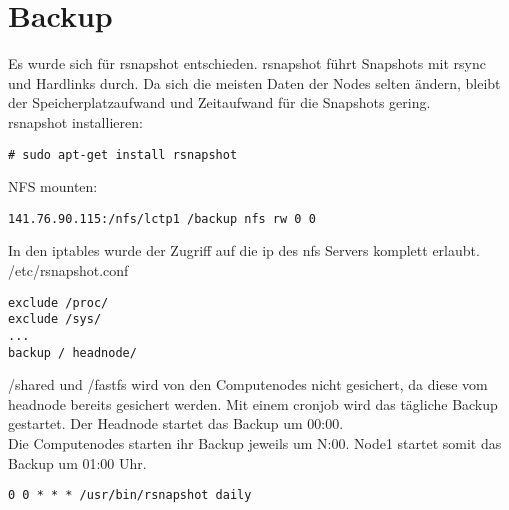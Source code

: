 \chapter{Backup}
Es wurde sich für rsnapshot entschieden. rsnapshot führt Snapshots mit rsync und Hardlinks durch.
Da sich die meisten Daten der Nodes selten ändern, bleibt der Speicherplatzaufwand und Zeitaufwand für die Snapshots gering.\\
rsnapshot installieren:
\begin{lstlisting}[style=Bash]
# sudo apt-get install rsnapshot
\end{lstlisting}
NFS mounten:
\begin{lstlisting}[style=Bash]
141.76.90.115:/nfs/lctp1 /backup nfs rw 0 0 
\end{lstlisting}
In den iptables wurde der Zugriff auf die ip des nfs Servers komplett erlaubt.
/etc/rsnapshot.conf
\begin{lstlisting}[style=Bash]
exclude /proc/
exclude /sys/
...
backup / headnode/
\end{lstlisting}
/shared und /fastfs wird von den Computenodes nicht gesichert, da diese vom headnode bereits gesichert werden.
Mit einem cronjob wird das tägliche Backup gestartet. Der Headnode startet das Backup um 00:00. \\
Die Computenodes starten ihr Backup jeweils um N:00. Node1 startet somit das Backup um 01:00 Uhr.
\begin{lstlisting}[style=Bash]
0 0 * * * /usr/bin/rsnapshot daily
\end{lstlisting}
